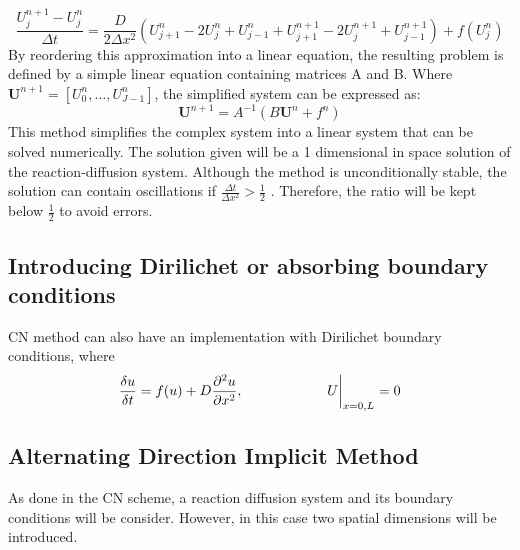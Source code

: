 \begin{equation}
    \frac{U^{n+1}_{j} - U^{n}_{j} }{\Delta t} = \frac{D}{2\Delta x^{2}}\left( U^{n}_{j+1} -  2U^{n}_{j} + U^{n}_{j-1} + U^{n+1}_{j+1} - 2U^{n+1}_{j} + U^{n+1}_{j-1}\right) +  f( U^{n}_{j})
\end{equation}
By reordering this approximation into a linear equation, the resulting problem is defined by a simple linear equation containing matrices A and B. Where $\textbf{U}^{n+1} = [U^{n}_{0}, \ldots , U^{n}_{J-1}]$, the simplified system can be expressed as:
\begin{equation}
    \textbf{U}^{n+1} = A^{-1}(B\textbf{U}^{n} + f^{n})
\end{equation}
This method simplifies the complex system into a linear system that can be solved numerically. The solution given will be a 1 dimensional in space solution of the reaction-diffusion system. Although the method is  unconditionally stable, the solution can contain oscillations if $ \frac{\Delta t}{\Delta x^{2}} >\frac{1}{2} $ \parencite{trefethen1996finite}. Therefore, the ratio will be kept below $\frac{1}{2}$ to avoid errors.

\subsection{Introducing Dirilichet or absorbing boundary conditions}\label{dirilichet}
CN method can also have an implementation with Dirilichet boundary conditions, where
\begin{equation}
    \frac{\delta u}{\delta t} =  f(u) + D\frac{\partial^{2} {u}}{\partial {x}^{2}},   \quad \quad \quad \quad \quad \quad U\biggr\rvert_{x=0,L}=0
\end{equation}
\subsection{Alternating Direction Implicit Method}\label{ADI}
As done in the \acrshort{CN} scheme, a reaction diffusion system and its boundary conditions will be consider. However, in this case two spatial dimensions will be introduced.

